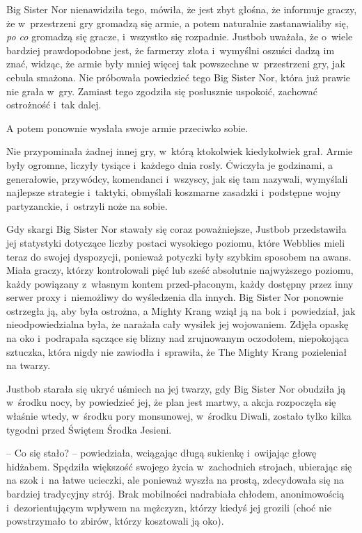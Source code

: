 \documentclass[oneside,polish,11pt,rmheadings]{mwbk}
\begin{document}
Big Sister Nor nienawidziła tego, mówiła, że jest zbyt głośna, że informuje graczy, że w~przestrzeni gry gromadzą się armie, a potem naturalnie zastanawialiby się, \textit{po co }gromadzą się gracze, i~wszystko się rozpadnie. Justbob uważała, że o~wiele bardziej prawdopodobne jest, że farmerzy złota i~wymyślni oszuści dadzą im znać, widząc, że armie były mniej więcej tak powszechne w~przestrzeni gry, jak cebula smażona. Nie próbowała powiedzieć tego Big Sister Nor, która już prawie nie grała w~gry. Zamiast tego zgodziła się posłusznie uspokoić, zachować ostrożność i~tak dalej.

A potem ponownie wysłała swoje armie przeciwko sobie.

Nie przypominała żadnej innej gry, w~którą ktokolwiek kiedykolwiek grał. Armie były ogromne, liczyły tysiące i~każdego dnia rosły. Ćwiczyła je godzinami, a generałowie, przywódcy, komendanci i~wszyscy, jak się tam nazywali, wymyślali najlepsze strategie i~taktyki, obmyślali koszmarne zasadzki i~podstępne wojny partyzanckie, i~ostrzyli noże na sobie.

Gdy skargi Big Sister Nor stawały się coraz poważniejsze, Justbob przedstawiła jej statystyki dotyczące liczby postaci wysokiego poziomu, które Webblies mieli teraz do swojej dyspozycji, ponieważ potyczki były szybkim sposobem na awans. Miała graczy, którzy kontrolowali pięć lub sześć absolutnie najwyższego poziomu, każdy powiązany z~własnym kontem przed-płaconym, każdy dostępny przez inny serwer proxy i~niemożliwy do wyśledzenia dla innych. Big Sister Nor ponownie ostrzegła ją, aby była ostrożna, a Mighty Krang wziął ją na bok i~powiedział, jak nieodpowiedzialna była, że narażała cały wysiłek jej wojowaniem. Zdjęła opaskę na oko i~podrapała sączące się blizny nad zrujnowanym oczodołem, niepokojąca sztuczka, która nigdy nie zawiodła i~sprawiła, że The Mighty Krang pozieleniał na twarzy.

Justbob starała się ukryć uśmiech na jej twarzy, gdy Big Sister Nor obudziła ją w~środku nocy, by powiedzieć jej, że plan jest martwy, a akcja rozpoczęła się właśnie wtedy, w~środku pory monsunowej, w~środku Diwali, zostało tylko kilka tygodni przed Świętem Środka Jesieni.

-- Co się stało? -- powiedziała, wciągając długą sukienkę i~owijając głowę hidżabem. Spędziła większość swojego życia w~zachodnich strojach, ubierając się na szok i~na łatwe ucieczki, ale ponieważ wyszła na prostą, zdecydowała się na bardziej tradycyjny strój. Brak mobilności nadrabiała chłodem, anonimowością i~dezorientującym wpływem na mężczyzn, którzy kiedyś jej grozili (choć nie powstrzymało to zbirów, którzy kosztowali ją oko).
\end{document}
